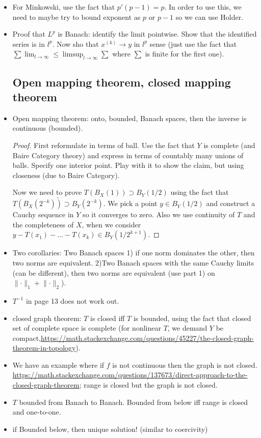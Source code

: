 \documentclass{article}
\theoremstyle{remark}
\begin{document}
\begin{itemize}
\item For Minkowski, use the fact that $p'(p-1)=p$. In order to use this, we need to maybe try to bound exponent as $p$ or $p-1$ so we can use Holder.

\item Proof that $L^p$ is Banach: identify the limit pointwise. Show that the identified series is in $l^p$. Now sho that $x^{(k)}\to y$ in $l^p$ sense (just use the fact that $\sum \lim_{l\to\infty}\leq\limsup_{l\to\infty}\sum$ where $\sum$ is finite for the first one).
\subsection*{Open mapping theorem, closed mapping theorem}
\item Open mapping theorem: onto, bounded, Banach spaces, then the inverse is continuous (bounded).
\begin{proof}
First reformulate in terms of ball. Use the fact that $Y$ is complete (and Baire Category theory) and express in terms of countably many unions of balls. Specify one interior point. Play with it to show the claim, but using closeness (due to Baire Category).

Now we need to prove $T(B_X (1))\supset B_Y(1/2)$ using the fact that $\bar{T(B_X(2^{-k}))\supset B_Y(2^{-k})}$. We pick a point $y\in B_Y(1/2)$ and construct a Cauchy sequence in $Y$ so it converges to zero. Also we use continuity of $T$ and the completeness of $X$, when we consider $y-T(x_1)-\dots-T(x_k)\in B_Y(1/2^{k+1})$.
\end{proof}
\item Two corollaries: Two Banach spaces 1) if one norm dominates the other, then two norms are equivalent. 2)Two Banach spaces with the same Cauchy limits (can be different), then two norms are equivalent (use part 1) on $\lVert\cdot\rVert_1+\lVert\cdot\rVert_2$). 
\item $T^{-1}$ in page 13 does not work out.
\item closed graph theorem: $T$ is closed iff $T$ is bounded, using the fact that closed set of complete space is complete (for nonlinear $T$, we demand $Y$ be compact,\url{https://math.stackexchange.com/questions/45227/the-closed-graph-theorem-in-topology}).
\item We have an example where if $f$ is not continuous then the graph is not closed. \url{https://math.stackexchange.com/questions/137673/direct-approach-to-the-closed-graph-theorem}; range is closed but the graph is not closed.
\item $T$ bounded from Banach to Banach. Bounded from below iff range is closed and one-to-one.
\item if Bounded below, then unique solution! (similar to coercivity)

\end{itemize}
\end{document}
